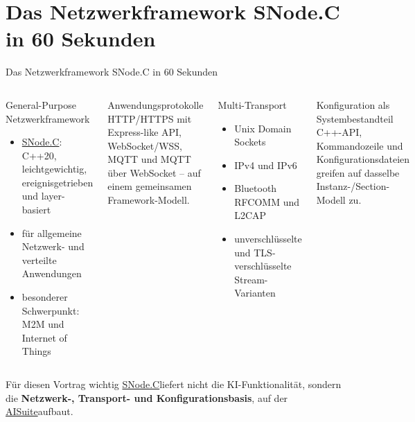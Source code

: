 \documentclass[\fhformat,10pt]{style/fh-ooe}
\newcommand{\SNodeCLink}{\href{https://github.com/SNodeC/snode.c}{SNode.C}}
\newcommand{\AISuiteLink}{\href{https://github.com/SNodeC/AISuite}{AISuite}}
\begin{document}
\section{Das Netzwerkframework SNode.C in 60 Sekunden}
\begin{frame}{Das Netzwerkframework SNode.C in 60 Sekunden}
\small
\begin{columns}[T]
\begin{block}{General-Purpose Netzwerkframework}
\begin{itemize}
  \item \SNodeCLink: C++20, leichtgewichtig, ereignisgetrieben und layer-basiert
  \item für allgemeine Netzwerk- und verteilte Anwendungen
  \item besonderer Schwerpunkt: M2M und Internet of Things
\end{itemize}
\end{block}
\begin{block}{Anwendungsprotokolle}
HTTP/HTTPS mit Express-like API, WebSocket/WSS, MQTT und MQTT über WebSocket -- auf einem gemeinsamen Framework-Modell.
\end{block}
\begin{block}{Multi-Transport}
\begin{itemize}
  \item Unix Domain Sockets
  \item IPv4 und IPv6
  \item Bluetooth RFCOMM und L2CAP
  \item unverschlüsselte und TLS-verschlüsselte Stream-Varianten
\end{itemize}
\end{block}
\begin{block}{Konfiguration als Systembestandteil}
C++-API, Kommandozeile und Konfigurationsdateien greifen auf dasselbe Instanz-/Section-Modell zu.
\end{block}
\end{columns}
\vspace{0.15em}
\begin{alertblock}{Für diesen Vortrag wichtig}
\SNodeCLink liefert nicht die KI-Funktionalität, sondern die \textbf{Netzwerk-, Transport- und Konfigurationsbasis}, auf der \AISuiteLink aufbaut.
\end{alertblock}
\end{frame}

\end{document}
